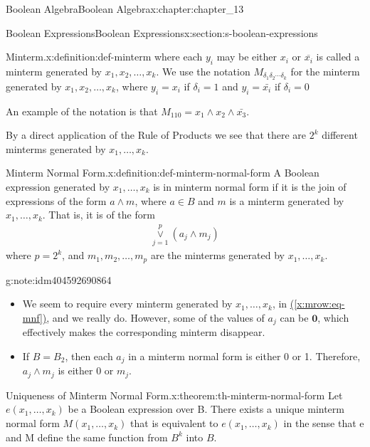 \documentclass[twoside,10pt,]{book}
\newcommand{\xreffont}{\relax}
\numberwithin{equation}{section}
\begin{document}
\begin{chapterptx}{Boolean Algebra}{}{Boolean Algebra}{}{}{x:chapter:chapter_13}
\begin{sectionptx}{Boolean Expressions}{}{Boolean Expressions}{}{}{x:section:s-boolean-expressions}
\begin{definition}{Minterm.}{x:definition:def-minterm}
where each \(y_i\) may be either  \(x_i\) or \(\overline{x_i}\) is  called a minterm generated by \(x_1, x_2,
\ldots , x_k\). We use the notation \(M_{\delta_1 \delta_2 \cdots \delta_k}\) for the minterm generated by \(x_1, x_2, \ldots , x_k\), where  \(y_i=x_i\) if \(\delta_i = 1\) and \(y_i=\bar{x_i}\) if \(\delta_i = 0\)%
\end{definition}
An example of the notation is that  \(M_{110} = x_1 \land x_2 \land \bar{x_3}\).%
\par
By a direct application of the  Rule of Products we see that there are \(2^k\) different minterms generated by \(x_1, \ldots , x_k\).%
\begin{definition}{Minterm Normal Form.}{x:definition:def-minterm-normal-form}%
%
A Boolean expression generated by \(x_1, \ldots , x_k\) is in minterm normal form if it is the join of expressions of the form  \(a \land m\), where \(a\in B\)  and \(m\) is a minterm  generated by \(x_1, \ldots , x_k\). That is, it is of the form%
\begin{gather}
\underset{j=1}{\overset{p}{\lor }}\left(a_j\land m_j\right)\label{x:mrow:eq-mnf}
\end{gather}
where \(p=2^k\),  and  \(m_1,m_2, \ldots , m_p\) are the minterms generated by  \(x_1, \ldots, x_k\).%
\end{definition}
\begin{note}{}{g:note:idm404592690864}%
%
\begin{itemize}[label=\textbullet]
\item{}We seem to require every minterm generated by \(x_1, \ldots, x_k\), in \hyperref[x:mrow:eq-mnf]{({\xreffont\ref{x:mrow:eq-mnf}})}, and we really do.  However, some of the values of \(a_j\) can be \(\pmb{0}\), which effectively makes the corresponding minterm disappear.%
\item{}If \(B=B_2\), then each \(a_j\) in a minterm normal form is either 0 or 1. Therefore, \(a_j\land m_j\) is either 0 or \(m_j\).%
\end{itemize}
%
\end{note}
\begin{theorem}{Uniqueness of Minterm Normal Form.}{}{x:theorem:th-minterm-normal-form}%
Let \(e\left(x_1,\ldots , x_k\right)\) be a Boolean expression over B. There exists a unique minterm normal form \(M\left(x_1, \ldots , x_k\right)\) that is equivalent to  \(e\left(x_1, \ldots , x_k\right)\) in the sense that e and M define the same function from \(B^k\) into \(B\).%
\end{theorem}

\end{sectionptx}
\end{chapterptx}
\end{document}
